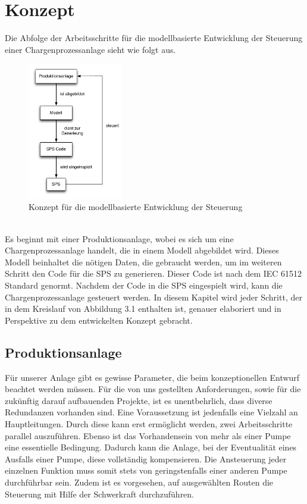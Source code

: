 
\chapter{Konzept} \label{chapter:architecture}
Die Abfolge der Arbeitsschritte für die modellbasierte Entwicklung der Steuerung einer Chargenprozessanlage sieht wie folgt aus.
\begin{figure}[h!]
		\centering
		\includegraphics[width=0.37\textwidth]{graphics/konzept/konzept_allblack.pdf}
		\caption{Konzept für die modellbasierte Entwicklung der Steuerung}
\end{figure} \\
Es beginnt mit einer Produktionsanlage, wobei es sich um eine Chargenprozessanlage handelt, die in einem Modell abgebildet wird. Dieses Modell beinhaltet die nötigen Daten, die gebraucht werden, um im weiteren Schritt den Code für die SPS zu generieren. Dieser Code ist nach dem IEC 61512 Standard genormt. Nachdem der Code in die SPS eingespielt wird, kann die Chargenprozessanlage gesteuert werden. 
In diesem Kapitel wird jeder Schritt, der in dem Kreislauf von Abbildung 3.1  enthalten ist, genauer elaboriert und in Perspektive zu dem entwickelten Konzept gebracht.

\section{Produktionsanlage}
Für unserer Anlage gibt es gewisse Parameter, die beim konzeptionellen Entwurf beachtet werden müssen. Für die von uns gestellten Anforderungen, sowie für die zukünftig darauf aufbauenden Projekte, ist es unentbehrlich, dass diverse Redundanzen vorhanden sind. Eine Voraussetzung ist jedenfalls eine Vielzahl an Hauptleitungen. Durch diese kann erst ermöglicht werden, zwei Arbeitsschritte parallel auszuführen. Ebenso ist das Vorhandensein von mehr als einer Pumpe eine essentielle Bedingung. Dadurch kann die Anlage, bei der Eventualität eines Ausfalls einer Pumpe, diese vollständig kompensieren. Die Ansteuerung jeder einzelnen Funktion muss somit stets von geringstenfalls einer anderen Pumpe durchführbar sein. Zudem ist es vorgesehen, auf ausgewählten Routen die Steuerung mit Hilfe der Schwerkraft durchzuführen.\\

